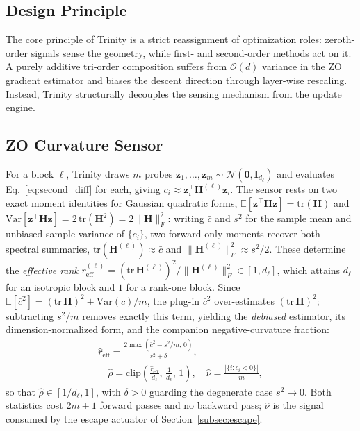 \documentclass[conference]{IEEEtran}
\begin{document}
\subsection{Design Principle}
\label{subsec:design_principle}
The core principle of Trinity is a strict reassignment of optimization roles: zeroth-order signals sense the geometry, while first- and second-order methods act on it. A purely additive tri-order composition suffers from $\mathcal{O}(d)$ variance in the ZO gradient estimator and biases the descent direction through layer-wise rescaling. Instead, Trinity structurally decouples the sensing mechanism from the update engine.

\subsection{ZO Curvature Sensor}
\label{subsec:zo_sensor}
For a block $\ell$, Trinity draws $m$ probes $\mathbf{z}_1, \dots, \mathbf{z}_m \sim \mathcal{N}(\mathbf{0}, \mathbf{I}_{d_\ell})$ and evaluates Eq.~\eqref{eq:second_diff} for each, giving $c_i \approx \mathbf{z}_i^\top \mathbf{H}^{(\ell)} \mathbf{z}_i$. The sensor rests on two exact moment identities for Gaussian quadratic forms, $\mathbb{E}[\mathbf{z}^\top\mathbf{H}\mathbf{z}] = \mathrm{tr}(\mathbf{H})$ and $\mathrm{Var}[\mathbf{z}^\top\mathbf{H}\mathbf{z}] = 2\,\mathrm{tr}(\mathbf{H}^2) = 2\|\mathbf{H}\|_F^2$: writing $\bar{c}$ and $s^2$ for the sample mean and unbiased sample variance of $\{c_i\}$, two forward-only moments recover both spectral summaries, $\mathrm{tr}(\mathbf{H}^{(\ell)}) \approx \bar{c}$ and $\|\mathbf{H}^{(\ell)}\|_F^2 \approx s^2/2$. These determine the \emph{effective rank} $r^{(\ell)}_{\mathrm{eff}} = (\mathrm{tr}\,\mathbf{H}^{(\ell)})^2 / \|\mathbf{H}^{(\ell)}\|_F^2 \in [1, d_\ell]$, which attains $d_\ell$ for an isotropic block and $1$ for a rank-one block. Since $\mathbb{E}[\bar{c}^2] = (\mathrm{tr}\,\mathbf{H})^2 + \mathrm{Var}(c)/m$, the plug-in $\bar{c}^2$ over-estimates $(\mathrm{tr}\,\mathbf{H})^2$; subtracting $s^2/m$ removes exactly this term, yielding the \emph{debiased} estimator, its dimension-normalized form, and the companion negative-curvature fraction:
\begin{equation}
\begin{aligned}
\hat{r}_{\mathrm{eff}} = \frac{2\max(\bar{c}^2 - s^2/m,\, 0)}{s^2 + \delta},
\\
\quad
\hat{\rho} = \mathrm{clip}\!\left(\frac{\hat{r}_{\mathrm{eff}}}{d_\ell},\, \frac{1}{d_\ell},\, 1\right),
\quad
\hat{\nu} = \frac{|\{i : c_i < 0\}|}{m},
\label{eq:rho_hat}
\end{aligned}
\end{equation}
so that $\hat{\rho} \in [1/d_\ell, 1]$, with $\delta > 0$ guarding the degenerate case $s^2 \to 0$. Both statistics cost $2m+1$ forward passes and no backward pass; $\hat{\nu}$ is the signal consumed by the escape actuator of Section~\ref{subsec:escape}.
\end{document}
